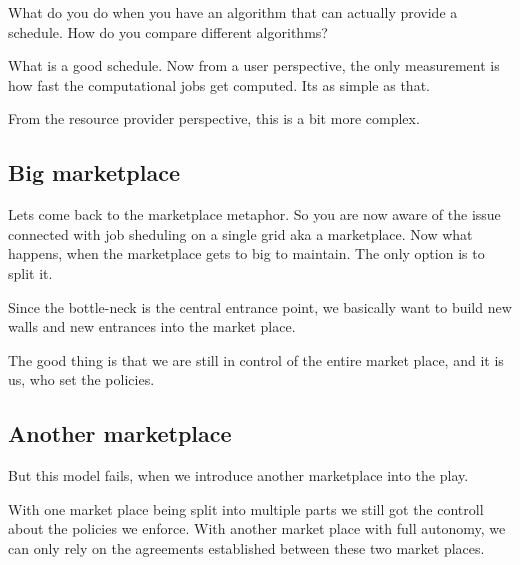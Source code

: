 \documentclass[12pt,a4paper]{article}
\begin{document}
What do you do when you have an algorithm that can actually provide a schedule.
How do you compare different algorithms?

What is a good schedule. Now from a user perspective, the only measurement is
how fast the computational jobs get computed. Its as simple as that.

From the resource provider perspective, this is a bit more complex. 

\subsection{Big marketplace}

Lets come back to the marketplace metaphor. So you are now aware of the issue
connected with job sheduling on a single grid aka a marketplace.  Now what
happens, when the marketplace gets to big to maintain. The only option is to split it.

Since the bottle-neck is the central entrance point, we basically want to build
new walls and new entrances into the market place.

The good thing is that we are still in control of the entire market place, and
it is us, who set the policies.

\subsection{Another marketplace}

But this model fails, when we introduce another marketplace into the play.

With one market place being split into multiple parts we still got the controll about the policies we enforce.
With another market place with full autonomy, we can only rely on the agreements established between these two market places.
\end{document}
